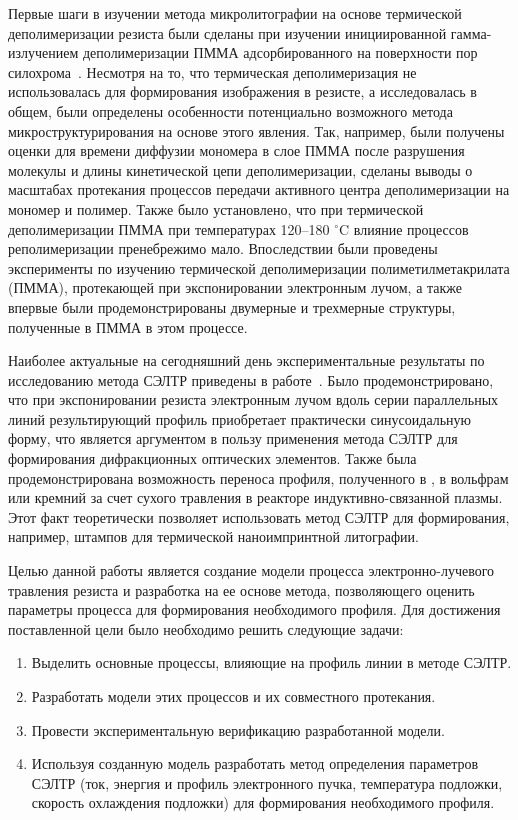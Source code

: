 \previouswork

Первые шаги в изучении метода микролитографии на основе термической деполимеризации резиста были сделаны при изучении инициированной гамма-излучением деполимеризации ПММА адсорбированного на поверхности пор силохрома~\cite{Bruk_2000}. Несмотря на то, что термическая деполимеризация не использовалась для формирования изображения в резисте, а исследовалась в общем, были определены особенности потенциально возможного метода микроструктурирования на основе этого явления. Так, например, были получены оценки для времени диффузии мономера в слое ПММА после разрушения молекулы и длины кинетической цепи деполимеризации, сделаны выводы о масштабах протекания процессов передачи активного центра деполимеризации на мономер и полимер. Также было установлено, что при термической деполимеризации ПММА при температурах 120--180 $^\circ$C влияние процессов реполимеризации пренебрежимо мало. Впоследствии были проведены эксперименты по изучению термической деполимеризации полиметилметакрилата (ПММА), протекающей при экспонировании электронным лучом, а также впервые были продемонстрированы двумерные и трехмерные структуры, полученные в ПММА в этом процессе.

Наиболее актуальные на сегодняшний день экспериментальные результаты по исследованию метода СЭЛТР приведены в работе~\cite{Bruk_2016_mee}. Было продемонстрировано, что при экспонировании резиста электронным лучом вдоль серии параллельных линий результирующий профиль приобретает практически синусоидальную форму, что является аргументом в пользу применения метода СЭЛТР для формирования дифракционных оптических элементов. Также была продемонстрирована возможность переноса профиля, полученного в , в вольфрам или кремний за счет сухого травления в реакторе индуктивно-связанной плазмы. Этот факт теоретически позволяет использовать метод СЭЛТР для формирования, например, штампов для термической наноимпринтной литографии.


\aimsandtasks

Целью данной работы является создание модели процесса электронно-лучевого травления резиста и разработка на ее основе метода, позволяющего оценить параметры процесса для формирования необходимого профиля. Для достижения поставленной цели было необходимо решить следующие задачи:

\begin{enumerate}
	\item Выделить основные процессы, влияющие на профиль линии в методе СЭЛТР.
	\item Разработать модели этих процессов и их совместного протекания.
	\item Провести экспериментальную верификацию разработанной модели.
	\item Используя созданную модель разработать метод определения параметров СЭЛТР (ток, энергия и профиль электронного пучка, температура подложки, скорость охлаждения подложки) для формирования необходимого профиля.
\end{enumerate}


